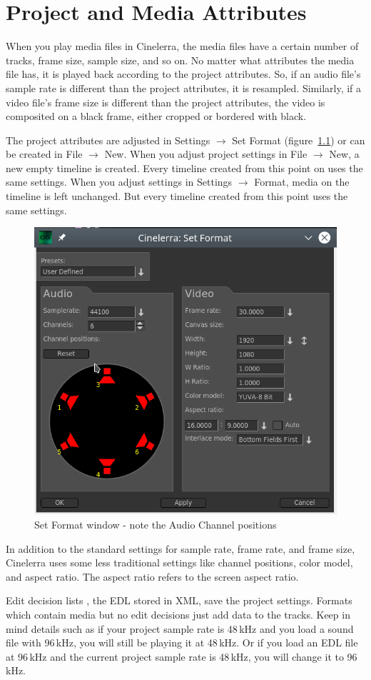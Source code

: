 \chapter{Project and Media Attributes}%
\label{cha:project_and_media_attributes}

When you play media files in Cinelerra, the media files have a certain number of tracks, frame size, sample size, and so on. 
No matter what attributes the media file has, it is played back according to the project attributes. 
So, if an audio file's sample rate is different than the project attributes, it is resampled. 
Similarly, if a video file's frame size is different than the project attributes, the video is composited on a black frame, either cropped or bordered with black.

The project attributes are adjusted in Settings $\rightarrow$ Set Format (figure~\ref{fig:set-format}) or can be created in File $\rightarrow$ New. 
When you adjust project settings in File $\rightarrow$ New, a new empty timeline is created. 
Every timeline created from this point on uses the same settings. 
When you adjust settings in Settings $\rightarrow$ Format, media on the timeline is left unchanged. 
But every timeline created from this point uses the same settings.

\begin{figure}[htpb]
	\centering
	\includegraphics[width=0.5\linewidth]{images/set-format.png}
	\caption{Set Format window - note the Audio Channel positions}
	\label{fig:set-format}
\end{figure}

In addition to the standard settings for sample rate, frame rate, and frame size, Cinelerra uses some less traditional settings like channel positions, color model, and aspect ratio.  
The aspect ratio refers to the screen aspect ratio.

Edit decision lists , the EDL stored in XML, save the project settings.  
Formats which contain media but no edit decisions just add data to the tracks. 
Keep in mind details such as if your project sample rate is 48\,kHz and you load a sound file with 96\,kHz, you will still be playing it at 48\,kHz.  
Or if you load an EDL file at 96\,kHz and the current project sample rate is 48\,kHz, you will change it to 96\,kHz.

